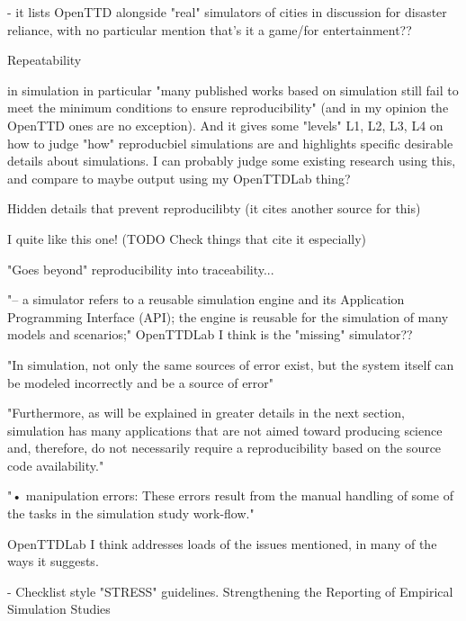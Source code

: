 \documentclass[logo,msc,dsti]{infthesis}    %
\begin{document}
\begin{itemize}
\begin{item}
\cite{cimellaro2016computational} - it lists OpenTTD alongside "real" simulators of cities in discussion for disaster reliance, with no particular mention that's it a game/for entertainment??
\end{item}

Repeatability


\begin{itemize}
\begin{item}
\cite{dalle2012reproducibility} in simulation in particular "many published works based on simulation still fail to meet the minimum conditions to ensure reproducibility" (and in my opinion the OpenTTD ones are no exception). And it gives some "levels" L1, L2, L3, L4 on how to judge "how" reproducbiel simulations are and highlights specific desirable details about simulations. I can probably judge some existing research using this, and compare to maybe output using my OpenTTDLab thing?

Hidden details that prevent reproducilibty (it cites another source for this)

I quite like this one! (TODO Check things that cite it especially)

"Goes beyond" reproducibility into traceability...

"– a simulator refers to a reusable simulation engine and its Application Programming Interface
(API); the engine is reusable for the simulation of many models and scenarios;" OpenTTDLab I think is the "missing" simulator??

"In simulation, not only the same sources of error
exist, but the system itself can be modeled incorrectly and be a source of error"

"Furthermore, as will be explained in greater details
in the next section, simulation has many applications that are not aimed toward producing science
and, therefore, do not necessarily require a reproducibility based on the source code availability."

"• manipulation errors: These errors result from the manual handling of some of the tasks in the simulation study work-flow."

OpenTTDLab I think addresses loads of the issues mentioned, in many of the ways it suggests.
\end{item}


\begin{item}
\cite{monks2019strengthening} - Checklist style "STRESS" guidelines. Strengthening the Reporting of Empirical Simulation Studies


\end{item}
\end{itemize}
\end{itemize}
\end{document}
